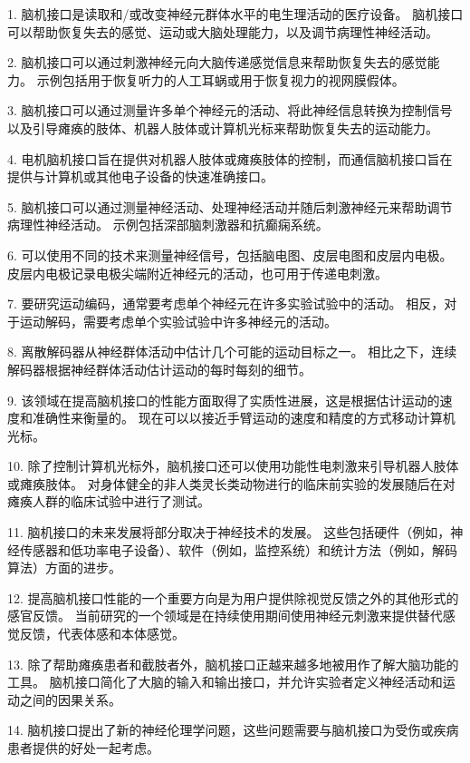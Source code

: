 1. 脑机接口是读取和/或改变神经元群体水平的电生理活动的医疗设备。
脑机接口可以帮助恢复失去的感觉、运动或大脑处理能力，以及调节病理性神经活动。


2. 脑机接口可以通过刺激神经元向大脑传递感觉信息来帮助恢复失去的感觉能力。
示例包括用于恢复听力的人工耳蜗或用于恢复视力的视网膜假体。


3. 脑机接口可以通过测量许多单个神经元的活动、将此神经信息转换为控制信号以及引导瘫痪的肢体、机器人肢体或计算机光标来帮助恢复失去的运动能力。


4. 电机脑机接口旨在提供对机器人肢体或瘫痪肢体的控制，而通信脑机接口旨在提供与计算机或其他电子设备的快速准确接口。


5. 脑机接口可以通过测量神经活动、处理神经活动并随后刺激神经元来帮助调节病理性神经活动。
示例包括深部脑刺激器和抗癫痫系统。


6. 可以使用不同的技术来测量神经信号，包括脑电图、皮层电图和皮层内电极。
皮层内电极记录电极尖端附近神经元的活动，也可用于传递电刺激。


7. 要研究运动编码，通常要考虑单个神经元在许多实验试验中的活动。
相反，对于运动解码，需要考虑单个实验试验中许多神经元的活动。


8. 离散解码器从神经群体活动中估计几个可能的运动目标之一。
相比之下，连续解码器根据神经群体活动估计运动的每时每刻的细节。


9. 该领域在提高脑机接口的性能方面取得了实质性进展，这是根据估计运动的速度和准确性来衡量的。
现在可以以接近手臂运动的速度和精度的方式移动计算机光标。


10. 除了控制计算机光标外，脑机接口还可以使用功能性电刺激来引导机器人肢体或瘫痪肢体。
对身体健全的非人类灵长类动物进行的临床前实验的发展随后在对瘫痪人群的临床试验中进行了测试。


11. 脑机接口的未来发展将部分取决于神经技术的发展。
这些包括硬件（例如，神经传感器和低功率电子设备）、软件（例如，监控系统）和统计方法（例如，解码算法）方面的进步。


12. 提高脑机接口性能的一个重要方向是为用户提供除视觉反馈之外的其他形式的感官反馈。
当前研究的一个领域是在持续使用期间使用神经元刺激来提供替代感觉反馈，代表体感和本体感觉。


13. 除了帮助瘫痪患者和截肢者外，脑机接口正越来越多地被用作了解大脑功能的工具。
脑机接口简化了大脑的输入和输出接口，并允许实验者定义神经活动和运动之间的因果关系。


14. 脑机接口提出了新的神经伦理学问题，这些问题需要与脑机接口为受伤或疾病患者提供的好处一起考虑。

